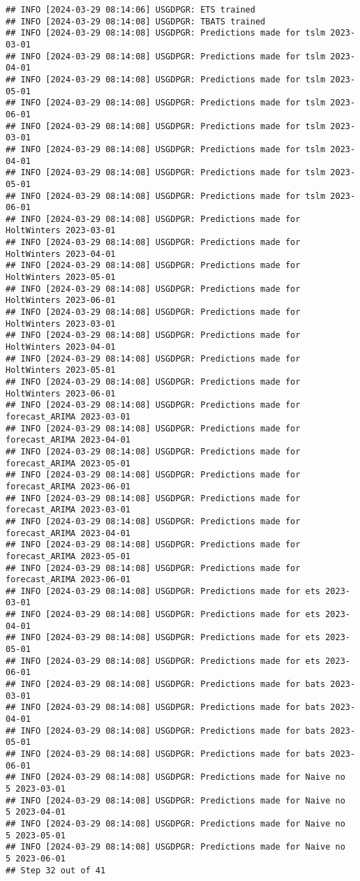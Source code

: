 \documentclass[
]{article}
\begin{document}
\begin{verbatim}
## INFO [2024-03-29 08:14:06] USGDPGR: ETS trained
## INFO [2024-03-29 08:14:08] USGDPGR: TBATS trained
## INFO [2024-03-29 08:14:08] USGDPGR: Predictions made for tslm 2023-03-01
## INFO [2024-03-29 08:14:08] USGDPGR: Predictions made for tslm 2023-04-01
## INFO [2024-03-29 08:14:08] USGDPGR: Predictions made for tslm 2023-05-01
## INFO [2024-03-29 08:14:08] USGDPGR: Predictions made for tslm 2023-06-01
## INFO [2024-03-29 08:14:08] USGDPGR: Predictions made for tslm 2023-03-01
## INFO [2024-03-29 08:14:08] USGDPGR: Predictions made for tslm 2023-04-01
## INFO [2024-03-29 08:14:08] USGDPGR: Predictions made for tslm 2023-05-01
## INFO [2024-03-29 08:14:08] USGDPGR: Predictions made for tslm 2023-06-01
## INFO [2024-03-29 08:14:08] USGDPGR: Predictions made for HoltWinters 2023-03-01
## INFO [2024-03-29 08:14:08] USGDPGR: Predictions made for HoltWinters 2023-04-01
## INFO [2024-03-29 08:14:08] USGDPGR: Predictions made for HoltWinters 2023-05-01
## INFO [2024-03-29 08:14:08] USGDPGR: Predictions made for HoltWinters 2023-06-01
## INFO [2024-03-29 08:14:08] USGDPGR: Predictions made for HoltWinters 2023-03-01
## INFO [2024-03-29 08:14:08] USGDPGR: Predictions made for HoltWinters 2023-04-01
## INFO [2024-03-29 08:14:08] USGDPGR: Predictions made for HoltWinters 2023-05-01
## INFO [2024-03-29 08:14:08] USGDPGR: Predictions made for HoltWinters 2023-06-01
## INFO [2024-03-29 08:14:08] USGDPGR: Predictions made for forecast_ARIMA 2023-03-01
## INFO [2024-03-29 08:14:08] USGDPGR: Predictions made for forecast_ARIMA 2023-04-01
## INFO [2024-03-29 08:14:08] USGDPGR: Predictions made for forecast_ARIMA 2023-05-01
## INFO [2024-03-29 08:14:08] USGDPGR: Predictions made for forecast_ARIMA 2023-06-01
## INFO [2024-03-29 08:14:08] USGDPGR: Predictions made for forecast_ARIMA 2023-03-01
## INFO [2024-03-29 08:14:08] USGDPGR: Predictions made for forecast_ARIMA 2023-04-01
## INFO [2024-03-29 08:14:08] USGDPGR: Predictions made for forecast_ARIMA 2023-05-01
## INFO [2024-03-29 08:14:08] USGDPGR: Predictions made for forecast_ARIMA 2023-06-01
## INFO [2024-03-29 08:14:08] USGDPGR: Predictions made for ets 2023-03-01
## INFO [2024-03-29 08:14:08] USGDPGR: Predictions made for ets 2023-04-01
## INFO [2024-03-29 08:14:08] USGDPGR: Predictions made for ets 2023-05-01
## INFO [2024-03-29 08:14:08] USGDPGR: Predictions made for ets 2023-06-01
## INFO [2024-03-29 08:14:08] USGDPGR: Predictions made for bats 2023-03-01
## INFO [2024-03-29 08:14:08] USGDPGR: Predictions made for bats 2023-04-01
## INFO [2024-03-29 08:14:08] USGDPGR: Predictions made for bats 2023-05-01
## INFO [2024-03-29 08:14:08] USGDPGR: Predictions made for bats 2023-06-01
## INFO [2024-03-29 08:14:08] USGDPGR: Predictions made for Naive no  5 2023-03-01
## INFO [2024-03-29 08:14:08] USGDPGR: Predictions made for Naive no  5 2023-04-01
## INFO [2024-03-29 08:14:08] USGDPGR: Predictions made for Naive no  5 2023-05-01
## INFO [2024-03-29 08:14:08] USGDPGR: Predictions made for Naive no  5 2023-06-01
## Step 32 out of 41
\end{verbatim}
\end{document}
